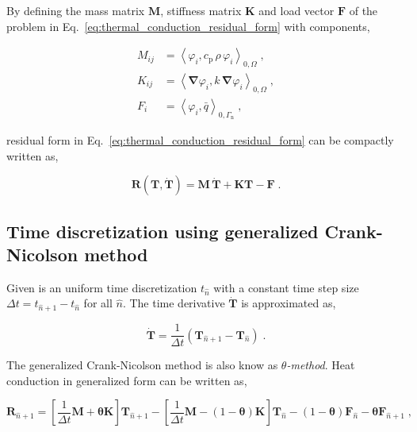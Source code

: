 \documentclass[10pt,a4paper]{article}
\begin{document}
By defining the mass matrix $\mathbf{M}$, stiffness matrix $\mathbf{K}$ and load vector $\mathbf{F}$ of the problem in Eq.~\eqref{eq:thermal_conduction_residual_form} with components,

\begin{subequations}
	\begin{alignat}{1}
		M_{ij} &= \left< \varphi_i , c_{\text{p}} \, \rho \, \varphi_i \right>_{0,\Omega} \;, \label{eq:massMtx} \\
		K_{ij} &= \left< \boldsymbol{\nabla} \varphi_i , k \, \boldsymbol{\nabla} \varphi_i \right>_{0,\Omega} \;, \label{eq:stiffMtx} \\
		F_i &= \left< \varphi_i , \bar{q} \right>_{0, \Gamma_{\text{n}}} \;, \label{eq:forceVct}
	\end{alignat}
	\label{eq:discrete_matrices}
\end{subequations}

residual form in Eq.~\eqref{eq:thermal_conduction_residual_form} can be compactly written as,

\begin{equation}
\mathbf{R}(\mathbf{T}, \dot{\mathbf{T}}) = \mathbf{M} \, \dot{\mathbf{T}} + \mathbf{K} \mathbf{T} - \mathbf{F} \;. \label{eq:thermal_conduction_residual_form_compact}
\end{equation}


\subsection{Time discretization using generalized Crank-Nicolson method}\label{subsec:time_discretization_ee}

Given is an uniform time discretization $t_{\hat{n}}$ with a constant time step size $\Delta t = t_{\hat{n} + 1} - t_{\hat{n}}$ for all $\hat{n}$. The time derivative $\dot{\mathbf{T}}$ is approximated as,

\begin{equation}
	\dot{\mathbf{T}} = \frac{1}{\Delta t} \left( \mathbf{T}_{\hat{n} + 1} - \mathbf{T}_{\hat{n}} \right) \;. \label{eq:timeDeriv_euler}
\end{equation}

The generalized Crank-Nicolson method is also know as $\theta$\textit{-method}. Heat conduction in generalized form can be written as,

\begin{equation}
	\mathbf{R}_{\hat{n} + 1} = \left[ \frac{1}{\Delta t} \mathbf{M} + \mathbf{\theta} \mathbf{K} \right]\mathbf{T}_{\hat{n} + 1} - \left[ \frac{1}{\Delta t} \mathbf{M} - (1-\mathbf{\theta})\mathbf{K} \right]\mathbf{T}_{\hat{n}} - (1-\mathbf{\theta})\mathbf{F}_{\hat{n}} - \mathbf{\theta}\mathbf{F}_{\hat{n} + 1} \;,
	\label{eq:general_cn_method}
\end{equation}
\end{document}
